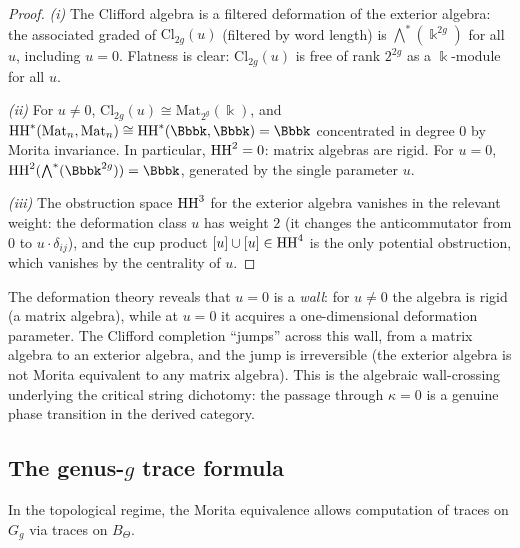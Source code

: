 \begin{proof}
\emph{(i)} The Clifford algebra is a filtered deformation of the
exterior algebra: the associated graded of $\mathrm{Cl}_{2g}(u)$
(filtered by word length) is $\bigwedge^*(\Bbbk^{2g})$ for all $u$,
including $u = 0$. Flatness is clear: $\mathrm{Cl}_{2g}(u)$ is free
of rank $2^{2g}$ as a $\Bbbk$-module for all $u$.

\emph{(ii)} For $u \neq 0$, $\mathrm{Cl}_{2g}(u) \cong
\mathrm{Mat}_{2^g}(\Bbbk)$, and $\HH^*(\mathrm{Mat}_n, \mathrm{Mat}_n)
\cong \HH^*(\Bbbk, \Bbbk) = \Bbbk$ concentrated in degree $0$ by
Morita invariance. In particular, $\operatorname{HH}^2 = 0$: matrix algebras are
rigid. For $u = 0$, $\HH^2(\bigwedge^*(\Bbbk^{2g})) = \Bbbk$,
generated by the single parameter $u$.

\emph{(iii)} The obstruction space $\operatorname{HH}^3$ for the exterior algebra
vanishes in the relevant weight: the deformation class $u$ has weight
$2$ (it changes the anticommutator from $0$ to $u \cdot \delta_{ij}$),
and the cup product $[u] \cup [u] \in \operatorname{HH}^4$ is the only potential
obstruction, which vanishes by the centrality of $u$.
\end{proof}

\begin{remark}[The wall-crossing at $u = 0$]
\label{rem:g9-wall-crossing}
The deformation theory reveals that $u = 0$ is a \emph{wall}: for
$u \neq 0$ the algebra is rigid (a matrix algebra), while at $u = 0$
it acquires a one-dimensional deformation parameter. The Clifford
completion ``jumps'' across this wall, from a matrix algebra to an
exterior algebra, and the jump is irreversible (the exterior algebra
is not Morita equivalent to any matrix algebra). This is the algebraic
wall-crossing underlying the critical string dichotomy: the passage
through $\kappa = 0$ is a genuine phase transition in the derived
category.
\end{remark}

%
%

\subsection{The genus-$g$ trace formula}
\label{subsec:trace-formula}

In the topological regime, the Morita equivalence allows computation of
traces on $G_g$ via traces on $B_\Theta$.

